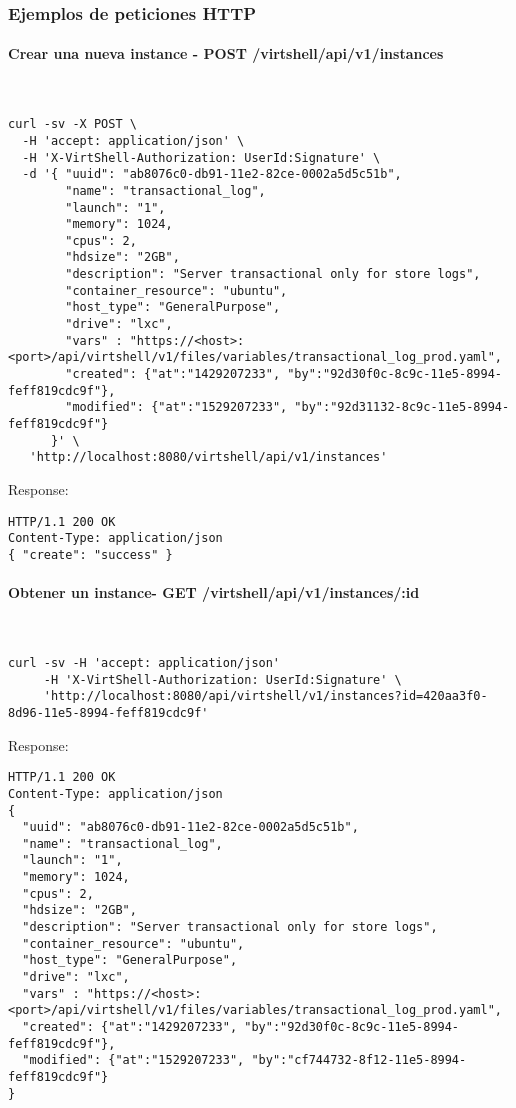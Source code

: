\subsubsection{Ejemplos de peticiones HTTP}

\paragraph{Crear una nueva instance - POST /virtshell/api/v1/instances} ~\\


\begin{lstlisting}[style=json]
curl -sv -X POST \
  -H 'accept: application/json' \
  -H 'X-VirtShell-Authorization: UserId:Signature' \
  -d '{ "uuid": "ab8076c0-db91-11e2-82ce-0002a5d5c51b",
        "name": "transactional_log",
        "launch": "1",
        "memory": 1024,
        "cpus": 2,
        "hdsize": "2GB",
        "description": "Server transactional only for store logs", 
        "container_resource": "ubuntu",
        "host_type": "GeneralPurpose",
        "drive": "lxc",
        "vars" : "https://<host>:<port>/api/virtshell/v1/files/variables/transactional_log_prod.yaml",
        "created": {"at":"1429207233", "by":"92d30f0c-8c9c-11e5-8994-feff819cdc9f"},
        "modified": {"at":"1529207233", "by":"92d31132-8c9c-11e5-8994-feff819cdc9f"}
      }' \
   'http://localhost:8080/virtshell/api/v1/instances'
\end{lstlisting}

Response:

\begin{lstlisting}[style=json]
HTTP/1.1 200 OK
Content-Type: application/json
{ "create": "success" }
\end{lstlisting}

\paragraph{Obtener un instance- GET /virtshell/api/v1/instances/:id} ~\\

\begin{lstlisting}[style=json]
curl -sv -H 'accept: application/json' 
     -H 'X-VirtShell-Authorization: UserId:Signature' \ 
     'http://localhost:8080/api/virtshell/v1/instances?id=420aa3f0-8d96-11e5-8994-feff819cdc9f'
\end{lstlisting}

Response:

\begin{lstlisting}[style=json]
HTTP/1.1 200 OK
Content-Type: application/json
{
  "uuid": "ab8076c0-db91-11e2-82ce-0002a5d5c51b",
  "name": "transactional_log",
  "launch": "1",
  "memory": 1024,
  "cpus": 2,
  "hdsize": "2GB",
  "description": "Server transactional only for store logs", 
  "container_resource": "ubuntu",
  "host_type": "GeneralPurpose",
  "drive": "lxc",
  "vars" : "https://<host>:<port>/api/virtshell/v1/files/variables/transactional_log_prod.yaml",
  "created": {"at":"1429207233", "by":"92d30f0c-8c9c-11e5-8994-feff819cdc9f"},
  "modified": {"at":"1529207233", "by":"cf744732-8f12-11e5-8994-feff819cdc9f"}
}
\end{lstlisting}

